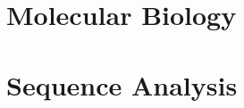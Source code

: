 \documentclass[nohyper,nobib]{tufte-book}
\begin{document}
\mainmatter

\part{Molecular Biology}



\part{Sequence Analysis}




% 

\backmatter

% 
% 
\end{document}

